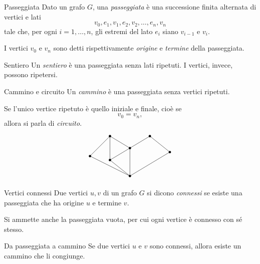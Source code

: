 \documentclass[a4paper]{article}
\begin{document}
\begin{snippetdefinition}{Passeggiata}
    Dato un grafo \(G\), una \emph{passeggiata} è una successione finita alternata di vertici e lati
    \[
        v_0,e_1,v_1,e_2,v_2,\ldots,e_n,v_n
    \]
    tale che, per ogni \(i=1,\ldots,n\), gli estremi del lato \(e_i\) siano \(v_{i-1}\) e \(v_i\).

    I vertici \(v_0\) e \(v_n\) sono detti rispettivamente \emph{origine} e \emph{termine} della passeggiata.
\end{snippetdefinition}

\begin{snippetdefinition}{Sentiero}
    Un \emph{sentiero} è una passeggiata senza lati ripetuti. I vertici, invece, possono ripetersi.
\end{snippetdefinition}

\begin{snippetdefinition}{Cammino e circuito}
    Un \emph{cammino} è una passeggiata senza vertici ripetuti.

    Se l'unico vertice ripetuto è quello iniziale e finale, cioè se
    \[
        v_0=v_n,
    \]
    allora si parla di \emph{circuito}.
\end{snippetdefinition}

\[
    \begin{tikzpicture}[scale=1]
        \coordinate (a) at (-2,0);
        \coordinate (b) at (-1,1);
        \coordinate (c) at (0,0.4);
        \coordinate (d) at (1,1);
        \coordinate (e) at (2,0.2);
        \coordinate (f) at (0,-1);
        \coordinate (g) at (-1,-0.2);

        \draw (a)--(b)--(c)--(d)--(e)--(f)--(a);
        \draw (g)--(b);
        \draw (g)--(c);
        \draw (g)--(f);
        \draw (c)--(f);

        \foreach \p in {a,b,c,d,e,f,g}{
            \fill (\p) circle (1.7pt);
        }
    \end{tikzpicture}
\]

\begin{snippetdefinition}{Vertici connessi}
    Due vertici \(u,v\) di un grafo \(G\) si dicono \emph{connessi} se esiste una passeggiata che ha origine \(u\) e termine \(v\).

    Si ammette anche la passeggiata vuota, per cui ogni vertice è connesso con sé stesso.
\end{snippetdefinition}

\begin{snippetproposition}{Da passeggiata a cammino}
    Se due vertici \(u\) e \(v\) sono connessi, allora esiste un cammino che li congiunge.
\end{snippetproposition}
\end{document}
